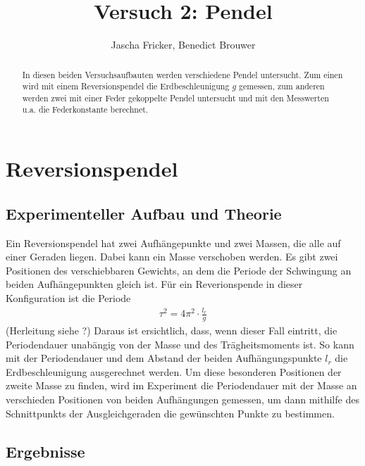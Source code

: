 \documentclass[11pt, a4paper]{article}
\title{Versuch 2: Pendel}
\author{Jascha Fricker, Benedict Brouwer}
\begin{document}
    \maketitle

    

    \begin{abstract}
        In diesen beiden Versuchsaufbauten werden verschiedene Pendel untersucht. Zum einen wird mit
        einem Reversionspendel die Erdbeschleunigung $g$ gemessen, zum anderen werden zwei mit einer Feder
        gekoppelte Pendel untersucht und mit den Messwerten u.a. die Federkonstante berechnet.
    \end{abstract}

    \tableofcontents

    \section{Reversionspendel}

    \subsection{Experimenteller Aufbau und Theorie}

    Ein Reversionspendel hat zwei Aufhängepunkte und zwei Massen, die alle auf einer Geraden liegen.
    Dabei kann ein Masse verschoben werden.
    Es gibt zwei Positionen des verschiebbaren Gewichts, an dem die Periode der Schwingung an beiden
    Aufhängepunkten gleich ist. Für ein Reverionspende in dieser Konfiguration ist die Periode
    \begin{align}
        \tau^2 = 4\pi^2 \cdot \frac{l_r}{g}
    \end{align}
    (Herleitung siehe ?) Daraus ist ersichtlich, dass, wenn dieser Fall eintritt, die Periodendauer unabängig von der Masse und des
    Trägheitsmoments ist. So kann mit der Periodendauer und dem Abstand der beiden Aufhängungspunkte $l_r$
    die Erdbeschleunigung ausgerechnet werden.
    Um diese besonderen Positionen der zweite Masse zu finden, wird im Experiment die Periodendauer
    mit der Masse an verschieden Positionen von beiden Aufhängungen gemessen,
    um dann mithilfe des Schnittpunkts der Ausgleichgeraden die gewünschten
    Punkte  zu bestimmen.



    \subsection{Ergebnisse}
\end{document}
